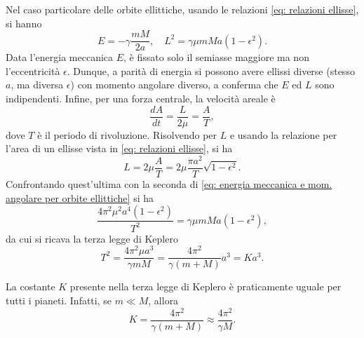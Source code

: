 Nel caso particolare delle orbite ellittiche, usando le relazioni \eqref{eq: relazioni ellisse}, si hanno
\begin{equation}
\label{eq: energia meccanica e mom. angolare per orbite ellittiche}
    E=-\gamma\frac{mM}{2a},\quad L^2=\gamma\mu mMa(1-\epsilon^2).
\end{equation}
Data l'energia meccanica $E$, è fissato solo il semiasse maggiore ma non l'eccentricità $\epsilon$. Dunque, a parità di energia si possono avere ellissi diverse (stesso $a$, ma diversa $\epsilon$) con momento angolare diverso, a conferma che $E$ ed $L$ sono indipendenti. Infine, per una forza centrale, la velocità areale è
\begin{equation}
    \frac{dA}{dt}=\frac{L}{2\mu}=\frac{A}{T},
\end{equation}
dove $T$ è il periodo di rivoluzione. Risolvendo per $L$ e usando la relazione per l'area di un ellisse vista in \eqref{eq: relazioni ellisse}, si ha
\begin{equation}
    L=2\mu\frac{A}{T}=2\mu\frac{\pi a^2}{T}\sqrt{1-\epsilon^2}.
\end{equation}
Confrontando quest'ultima con la seconda di \eqref{eq: energia meccanica e mom. angolare per orbite ellittiche} si ha
\begin{equation}
    \frac{4\pi^2\mu^2a^4(1-\epsilon^2)}{T^2}=\gamma\mu mMa(1-\epsilon^2),
\end{equation}
da cui si ricava la terza legge di Keplero
\begin{equation}
    T^2=\frac{4\pi^2\mu a^3}{\gamma mM}=\frac{4\pi^2}{\gamma(m+M)}a^3=Ka^3.
\end{equation}
\begin{obs}
    La costante $K$ presente nella terza legge di Keplero è praticamente uguale per tutti i pianeti. Infatti, se $m\ll M$, allora
    \begin{equation}
        K=\frac{4\pi^2}{\gamma(m+M)}\approx\frac{4\pi^2}{\gamma M}.
    \end{equation}
\end{obs}